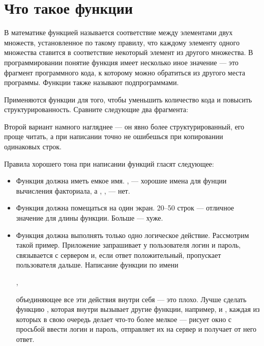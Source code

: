 \documentclass[book.tex]{subfiles}
\begin{document}



\maketitle

\section*{Что такое функции}

В математике функцией называется соответствие между элементами двух множеств, установленное по такому правилу, что каждому элементу одного множества ставится в соответствие некоторый элемент из другого множества. В программировании понятие функция имеет несколько иное значение --- это фрагмент программного кода, к которому можно обратиться из другого места программы. Функции также называют подпрограммами.

Применяются функции для того, чтобы уменьшить количество кода и повысить структурированность. Сравните следующие два фрагмента:



Второй вариант намного нагляднее --- он явно более структурированный, его проще читать, а при написании точно не ошибешься при копировании одинаковых строк.

Правила хорошего тона при написании функций гласят следующее:

\begin{itemize}
\item Функция должна иметь емкое имя. ,  --- хорошие имена для фунции вычисления факториала, а , ,  --- нет.
\item Функция должна помещаться на один экран. 20--50 строк --- отличное значение для длины функции. Больше --- хуже.
\item Функция должна выполнять только одно логическое действие. Рассмотрим такой пример. Приложение запрашивает у пользователя логин и пароль, связывается с сервером и, если ответ положительный, пропускает пользователя дальше. Написание функции по имени 

, 

объединяющее все эти действия внутри себя --- это плохо. Лучше сделать функцию , которая внутри вызывает другие функции, например,  и , каждая из которых в свою очередь делает что-то более мелкое --- рисует окно с просьбой ввести логин и пароль, отправляет их на сервер и получает от него ответ.
\end{itemize}
\end{document}
